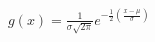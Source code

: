 \documentclass[12pt]{standalone}
\begin{document}
$g(x) = \frac{1}{\sigma\sqrt{2\pi}}e^{-\frac{1}{2}(\frac{x - \mu}{\sigma})}$
\end{document}
